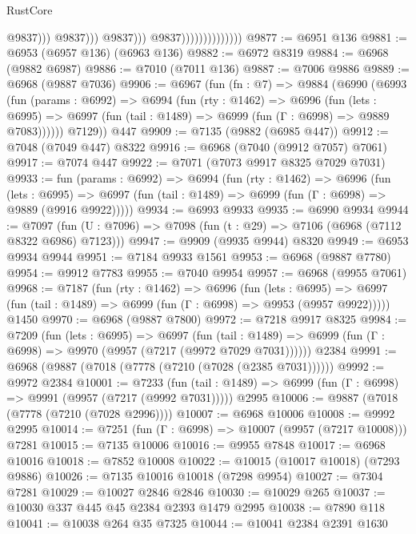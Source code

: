 \begin{lexlean}{RustCore}
\begin{coremodule}
                                                  @9837)))
                                            @9837)))
                                      @9837)))
                                @9837))))))))))))))
@9877 := @6951 @136
@9881 := @6953 (@6957 @136) (@6963 @136)
@9882 := @6972 @8319
@9884 := @6968 (@9882 @6987)
@9886 := @7010 (@7011 @136)
@9887 := @7006 @9886
@9889 := @6968 (@9887 @7036)
@9906 := @6967
    (fun (fn : @7) =>
    @9884
      (@6990
        (@6993
          (fun (params : @6992) =>
          @6994
            (fun (rty : @1462) =>
            @6996
              (fun (lets : @6995) =>
              @6997 (fun (tail : @1489) => @6999 (fun (Γ : @6998) => @9889 @7083))))))
        @7129))
    @447
@9909 := @7135 (@9882 (@6985 @447))
@9912 := @7048 (@7049 @447) @8322
@9916 := @6968 (@7040 (@9912 @7057) @7061)
@9917 := @7074 @447
@9922 := @7071 (@7073 @9917 @8325 @7029 @7031)
@9933 := fun (params : @6992) =>
  @6994
    (fun (rty : @1462) =>
    @6996
      (fun (lets : @6995) =>
      @6997 (fun (tail : @1489) => @6999 (fun (Γ : @6998) => @9889 (@9916 @9922)))))
@9934 := @6993 @9933
@9935 := @6990 @9934
@9944 := @7097 (fun (U : @7096) => @7098 (fun (t : @29) => @7106 (@6968 (@7112 @8322 @6986) @7123)))
@9947 := @9909 (@9935 @9944) @8320
@9949 := @6953 @9934 @9944
@9951 := @7184 @9933 @1561
@9953 := @6968 (@9887 @7780)
@9954 := @9912 @7783
@9955 := @7040 @9954
@9957 := @6968 (@9955 @7061)
@9968 := @7187
    (fun (rty : @1462) =>
    @6996
      (fun (lets : @6995) =>
      @6997 (fun (tail : @1489) => @6999 (fun (Γ : @6998) => @9953 (@9957 @9922)))))
    @1450
@9970 := @6968 (@9887 @7800)
@9972 := @7218 @9917 @8325
@9984 := @7209
    (fun (lets : @6995) =>
    @6997
      (fun (tail : @1489) => @6999 (fun (Γ : @6998) => @9970 (@9957 (@7217 (@9972 @7029 @7031))))))
    @2384
@9991 := @6968 (@9887 (@7018 (@7778 (@7210 (@7028 (@2385 @7031))))))
@9992 := @9972 @2384
@10001 := @7233
    (fun (tail : @1489) => @6999 (fun (Γ : @6998) => @9991 (@9957 (@7217 (@9992 @7031)))))
    @2995
@10006 := @9887 (@7018 (@7778 (@7210 (@7028 @2996))))
@10007 := @6968 @10006
@10008 := @9992 @2995
@10014 := @7251 (fun (Γ : @6998) => @10007 (@9957 (@7217 @10008))) @7281
@10015 := @7135 @10006
@10016 := @9955 @7848
@10017 := @6968 @10016
@10018 := @7852 @10008
@10022 := @10015 (@10017 @10018) (@7293 @9886)
@10026 := @7135 @10016 @10018 (@7298 @9954)
@10027 := @7304 @7281
@10029 := @10027 @2846 @2846
@10030 := @10029 @265
@10037 := @10030 @337 @445 @45 @2384 @2393 @1479 @2995
@10038 := @7890 @118
@10041 := @10038 @264 @35 @7325
@10044 := @10041 @2384 @2391 @1630

\end{coremodule}
\end{lexlean}
